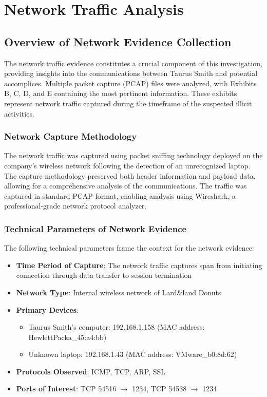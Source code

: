 \chapter{Network Traffic Analysis}

\section{Overview of Network Evidence Collection}
The network traffic evidence constitutes a crucial component of this investigation, providing insights into the communications between Taurus Smith and potential accomplices. Multiple packet capture (PCAP) files were analyzed, with Exhibits B, C, D, and E containing the most pertinent information. These exhibits represent network traffic captured during the timeframe of the suspected illicit activities.

\subsection{Network Capture Methodology}
The network traffic was captured using packet sniffing technology deployed on the company's wireless network following the detection of an unrecognized laptop. The capture methodology preserved both header information and payload data, allowing for a comprehensive analysis of the communications. The traffic was captured in standard PCAP format, enabling analysis using Wireshark, a professional-grade network protocol analyzer.

\subsection{Technical Parameters of Network Evidence}
The following technical parameters frame the context for the network evidence:

\begin{itemize}
    \item \textbf{Time Period of Capture}: The network traffic captures span from initiating connection through data transfer to session termination
    \item \textbf{Network Type}: Internal wireless network of Lard\&land Donuts
    \item \textbf{Primary Devices}: 
        \begin{itemize}
            \item Taurus Smith's computer: 192.168.1.158 (MAC address: HewlettPacka\_45:a4:bb)
            \item Unknown laptop: 192.168.1.43 (MAC address: VMware\_b0:8d:62)
        \end{itemize}
    \item \textbf{Protocols Observed}: ICMP, TCP, ARP, SSL
    \item \textbf{Ports of Interest}: TCP 54516 $\rightarrow$ 1234, TCP 54538 $\rightarrow$ 1234
\end{itemize}

